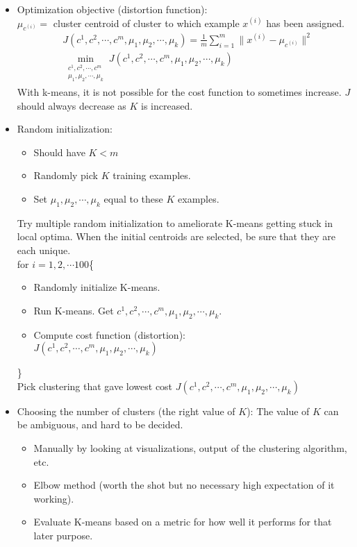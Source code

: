 \begin{itemize}
\item
    Optimization objective (distortion function):\\
    $\mu_{c^{(i)}} = $ cluster centroid of cluster to which example $x^{(i)}$ has been assigned.
    \begin{align}
    &J(c^{1}, c^{2}, \cdots, c^{m}, \mu_1, \mu_2, \cdots, \mu_k) = \frac{1}{m}\sum_{i=1}^m\|x^{(i)} - \mu_{c^{(i)}}\|^2\\
    &\min_{\substack{c^{1}, c^{2}, \cdots, c^{m} \\ \mu_1, \mu_2, \cdots, \mu_k}}{J(c^{1}, c^{2}, \cdots, c^{m}, \mu_1, \mu_2, \cdots, \mu_k)} \nonumber
    \end{align}
    With k-means, it is not possible for the cost function to sometimes increase. $J$ should always decrease as $K$ is increased.
\item
    Random initialization:
        \begin{itemize}
        \item
        Should have $K<m$
        \item
        Randomly pick $K$ training examples.
        \item
        Set $\mu_1, \mu_2, \cdots, \mu_k$ equal to these $K$ examples.
    \end{itemize}
    Try multiple random initialization to ameliorate K-means getting stuck in local optima. When the initial centroids are selected, be sure that they are each unique.\\
    for $i = 1, 2, \cdots 100$\{
    \begin{itemize}
        \item[]
        Randomly initialize K-means.
        \item[]
        Run K-means. Get $c^{1}, c^{2}, \cdots, c^{m}, \mu_1, \mu_2, \cdots, \mu_k$.
        \item[]
        Compute cost function (distortion):\\
        $J(c^{1}, c^{2}, \cdots, c^{m}, \mu_1, \mu_2, \cdots, \mu_k)$
    \end{itemize}
    \}\\
    Pick clustering that gave lowest cost $J(c^{1}, c^{2}, \cdots, c^{m}, \mu_1, \mu_2, \cdots, \mu_k)$
\item
    Choosing the number of clusters (the right value of $K$):
    The value of $K$ can be ambiguous, and hard to be decided.
    \begin{itemize}
    \item[]
    Manually by looking at visualizations, output of the clustering algorithm, etc.
    \item[]
    Elbow method (worth the shot but no necessary high expectation of it working).
    \item[]
    Evaluate K-means based on a metric for how well it performs for that later purpose.
    \end{itemize}  
\end{itemize}

